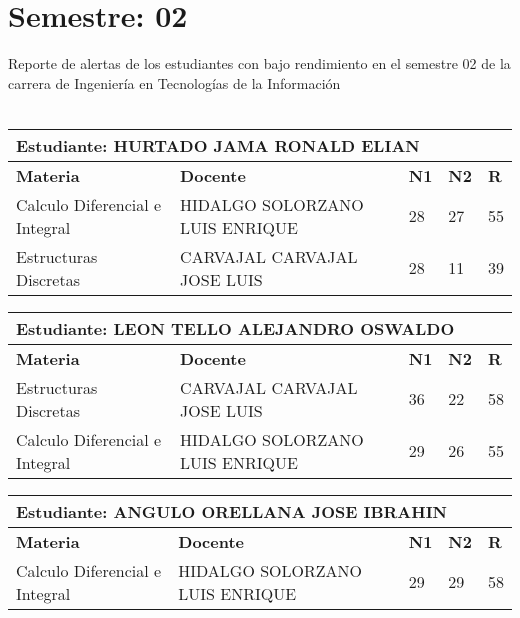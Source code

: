 \section{Semestre: 02}
        Reporte de alertas de los estudiantes con bajo rendimiento en el semestre 02 de la carrera de 
        Ingeniería en Tecnologías de la Información\\\\\small
\begin{tabularx}{\textwidth}{|p{5cm}|p{7cm}|X|X|X|}
\hline
\multicolumn{5}{|p{\dimexpr\textwidth-2\tabcolsep-2\arrayrulewidth}|}{\textbf{Estudiante: HURTADO JAMA RONALD ELIAN }}\\\hline
\textbf{Materia} & \textbf{Docente} & \textbf{N1} & \textbf{N2} & \textbf{R} \\ \hline
Calculo Diferencial e Integral & HIDALGO SOLORZANO LUIS ENRIQUE  & 28 & 27& 55 \\ \hline
Estructuras Discretas & CARVAJAL CARVAJAL JOSE LUIS  & 28 & 11& 39 \\ \hline
\end{tabularx}\vspace{10mm}
\small
\begin{tabularx}{\textwidth}{|p{5cm}|p{7cm}|X|X|X|}
\hline
\multicolumn{5}{|p{\dimexpr\textwidth-2\tabcolsep-2\arrayrulewidth}|}{\textbf{Estudiante: LEON TELLO ALEJANDRO OSWALDO }}\\\hline
\textbf{Materia} & \textbf{Docente} & \textbf{N1} & \textbf{N2} & \textbf{R} \\ \hline
Estructuras Discretas & CARVAJAL CARVAJAL JOSE LUIS  & 36 & 22& 58 \\ \hline
Calculo Diferencial e Integral & HIDALGO SOLORZANO LUIS ENRIQUE  & 29 & 26& 55 \\ \hline
\end{tabularx}\vspace{10mm}
\small
\begin{tabularx}{\textwidth}{|p{5cm}|p{7cm}|X|X|X|}
\hline
\multicolumn{5}{|p{\dimexpr\textwidth-2\tabcolsep-2\arrayrulewidth}|}{\textbf{Estudiante: ANGULO ORELLANA JOSE IBRAHIN }}\\\hline
\textbf{Materia} & \textbf{Docente} & \textbf{N1} & \textbf{N2} & \textbf{R} \\ \hline
Calculo Diferencial e Integral & HIDALGO SOLORZANO LUIS ENRIQUE  & 29 & 29& 58 \\ \hline
\end{tabularx}\vspace{10mm}
\small
